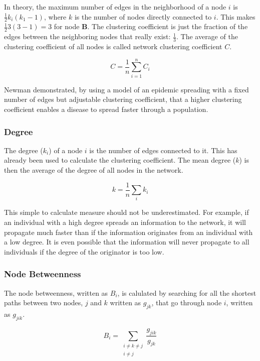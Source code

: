 In theory, the maximum number of edges in the neighborhood of a node $i$ is $\frac{1}{2}k_i(k_1 -1)$, where $k$ is the number of nodes directly connected to $i$. This makes $\frac{1}{2}3(3 -1) = 3$ for node \textbf{B}. The clustering coefficient is just the fraction of the edges between the neighboring nodes that really exist: $\frac{1}{3}$. The average of the clustering coefficient of all nodes is called network clustering coefficient $C$.

\begin{equation}
C = \frac{1}{n}\sum^n_{i=1}C_i
\end{equation}  

Newman\citep{newman:03} demonstrated, by using a model of an epidemic spreading with a fixed number of edges but adjustable clustering coefficient, that a higher clustering coefficient enables a disease to spread faster through a population.
     
\subsubsection{Degree}

The degree ($k_i$) of a node $i$ is the number of edges connected to it. This has already been used to calculate the clustering coefficient. The mean degree ($k$) is then the average of the degree of all nodes in the network.

\begin{equation}
k = \frac{1}{n}\sum_i k_i
\end{equation}

This simple to calculate measure should not be underestimated. For example, if an individual with a high degree spreads an information to the network, it will propagate much faster than if the information originates from an individual with a low degree. It is even possible that the information will never propagate to all individuals if the degree of the originator is too low.

\subsubsection{Node Betweenness}
\label{subsubsec:node_between}

The node betweenness, written as $B_i$, is calulated by searching for all the shortest paths between two nodes, $j$ and $k$ written as $g_{jk}$, that go through node $i$, written as $g_{jik}$.

\begin{equation}
B_i =	\sum_{
			\substack{i \neq k \neq j \\ i \neq j}
		}
		\frac{g_{jik}}{g_{jk}}
\end{equation}

